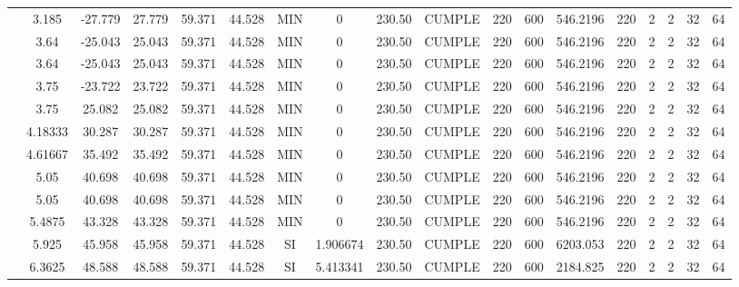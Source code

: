 \begin{table}[H]
{\begin{tabular}{|c|c|c|c|c|c|c|c|c|c|c|c|c|c|c|c|c|c|}
\cline{2-18}          & 3.185 & -27.779 & 27.779 & 59.371 & 44.528 & MIN   & 0     & 230.50 & CUMPLE & 220   & 600   & 546.2196 & 220   & 2     & 2     & 32    & 64 \bigstrut\\
\cline{2-18}          & 3.64  & -25.043 & 25.043 & 59.371 & 44.528 & MIN   & 0     & 230.50 & CUMPLE & 220   & 600   & 546.2196 & 220   & 2     & 2     & 32    & 64 \bigstrut\\
\cline{2-18}          & 3.64  & -25.043 & 25.043 & 59.371 & 44.528 & MIN   & 0     & 230.50 & CUMPLE & 220   & 600   & 546.2196 & 220   & 2     & 2     & 32    & 64 \bigstrut\\
\cline{2-18}          & 3.75  & -23.722 & 23.722 & 59.371 & 44.528 & MIN   & 0     & 230.50 & CUMPLE & 220   & 600   & 546.2196 & 220   & 2     & 2     & 32    & 64 \bigstrut\\
\cline{2-18}          & 3.75  & 25.082 & 25.082 & 59.371 & 44.528 & MIN   & 0     & 230.50 & CUMPLE & 220   & 600   & 546.2196 & 220   & 2     & 2     & 32    & 64 \bigstrut\\
\cline{2-18}          & 4.18333 & 30.287 & 30.287 & 59.371 & 44.528 & MIN   & 0     & 230.50 & CUMPLE & 220   & 600   & 546.2196 & 220   & 2     & 2     & 32    & 64 \bigstrut\\
\cline{2-18}          & 4.61667 & 35.492 & 35.492 & 59.371 & 44.528 & MIN   & 0     & 230.50 & CUMPLE & 220   & 600   & 546.2196 & 220   & 2     & 2     & 32    & 64 \bigstrut\\
\cline{2-18}          & 5.05  & 40.698 & 40.698 & 59.371 & 44.528 & MIN   & 0     & 230.50 & CUMPLE & 220   & 600   & 546.2196 & 220   & 2     & 2     & 32    & 64 \bigstrut\\
\cline{2-18}          & 5.05  & 40.698 & 40.698 & 59.371 & 44.528 & MIN   & 0     & 230.50 & CUMPLE & 220   & 600   & 546.2196 & 220   & 2     & 2     & 32    & 64 \bigstrut\\
\cline{2-18}          & 5.4875 & 43.328 & 43.328 & 59.371 & 44.528 & MIN   & 0     & 230.50 & CUMPLE & 220   & 600   & 546.2196 & 220   & 2     & 2     & 32    & 64 \bigstrut\\
\cline{2-18}          & 5.925 & 45.958 & 45.958 & 59.371 & 44.528 & SI    & 1.906674 & 230.50 & CUMPLE & 220   & 600   & 6203.053 & 220   & 2     & 2     & 32    & 64 \bigstrut\\
\cline{2-18}          & 6.3625 & 48.588 & 48.588 & 59.371 & 44.528 & SI    & 5.413341 & 230.50 & CUMPLE & 220   & 600   & 2184.825 & 220   & 2     & 2     & 32    & 64 \bigstrut\\

\end{tabular}}
\end{table}
